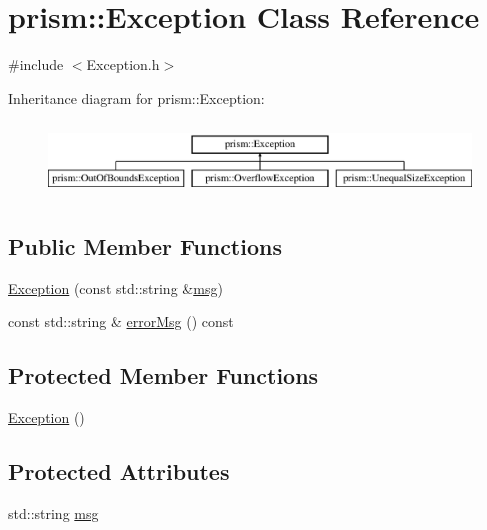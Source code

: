 \hypertarget{classprism_1_1_exception}{}\section{prism\+:\+:Exception Class Reference}
\label{classprism_1_1_exception}


{\ttfamily \#include $<$Exception.\+h$>$}

Inheritance diagram for prism\+:\+:Exception\+:\begin{figure}[H]
\begin{center}
\leavevmode
\includegraphics[height=1.996435cm]{classprism_1_1_exception}
\end{center}
\end{figure}
\subsection*{Public Member Functions}
\begin{DoxyCompactItemize}
\item 
\hyperlink{classprism_1_1_exception_ae878686fee2f57a9461a306a6a1e0fe7}{Exception} (const std\+::string \&\hyperlink{classprism_1_1_exception_ab768e96bc8a3f617b3420e19a18caf9f}{msg})
\item 
const std\+::string \& \hyperlink{classprism_1_1_exception_aba1bf849ad38dd259361be85672fc309}{error\+Msg} () const 
\end{DoxyCompactItemize}
\subsection*{Protected Member Functions}
\begin{DoxyCompactItemize}
\item 
\hyperlink{classprism_1_1_exception_aa99b00004a3c6643adbcf7c7575fd0ce}{Exception} ()
\end{DoxyCompactItemize}
\subsection*{Protected Attributes}
\begin{DoxyCompactItemize}
\item 
std\+::string \hyperlink{classprism_1_1_exception_ab768e96bc8a3f617b3420e19a18caf9f}{msg}
\end{DoxyCompactItemize}


